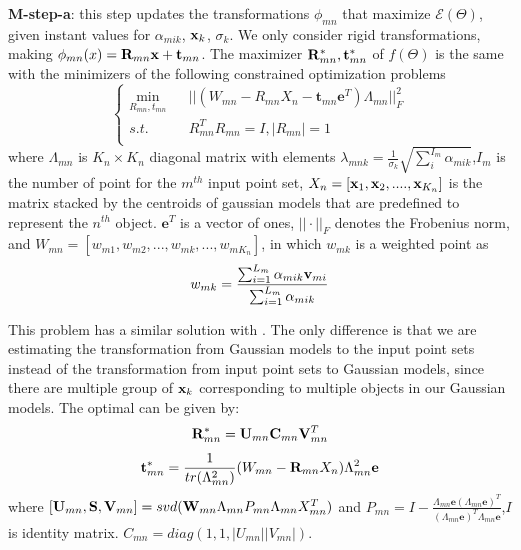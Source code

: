 \textbf{M-step-a}: this step updates the transformations $\phi_{mn}$ that maximize $\mathcal{E}(\Theta)$, given instant values for $\alpha_{mik}$, $\mathbf{x}_k$, $\sigma_k$.
%
We only consider rigid transformations, making  $\phi_{mn}(x)=\mathbf{R}_{mn}\mathbf{x}+\mathbf{t}_{mn}$. The maximizer $\mathbf{R}_{mn}^*,\mathbf{t}_{mn}^*$ of $f(\Theta)$ is the same with the minimizers of the following constrained optimization problems
%
\begin{equation}
\left\{
\begin{array}{rcl}
\min_{R_{mn},t_{mn}}&      &||(W_{mn}-R_{mn}X_n-\pmb t_{mn}\mathbf{e}^T)\Lambda_{mn}||_F^2\\
s.t.&      &R_{mn}^TR_{mn}=I, |R_{mn}|=1\\
\end{array} \right.
\end{equation}
where $\Lambda_{mn}$ is $K_n \times K_n$ diagonal matrix with elements $\lambda_{mnk}=\frac{1}{\sigma_k}\sqrt{\sum_i^{I_{m}}\alpha_{mik}}$,$I_m$ is the number of point for the $m^{th}$ input point set, $X_n = [\mathbf{x}_1, \mathbf{x}_2,...., \mathbf{x}_{K_n}]$ is the matrix stacked by the centroids of gaussian models that are predefined to represent the $n^{th}$ object. $\mathbf{e}^T$ is a vector of ones, $||\cdot||_F$ denotes the Frobenius norm, and $W_{mn}=[w_{m1},w_{m2},...,w_{mk},...,w_{mK_n}]$, in which $w_{mk}$ is a weighted point as
%
\begin{equation}
w_{mk}=\frac{\sum_{i=1}^{L_m}\alpha_{mik} \mathbf{v}_{mi}}{\sum_{i=1}^{L_m}\alpha_{mik}}
\end{equation}

This problem has a similar solution with \cite{Evangelidis2014}. 
The only difference is that we are estimating the transformation from Gaussian models to the input point sets instead of the transformation from input point sets to Gaussian models, since there are multiple group of $\mathbf{x}_k$ corresponding to multiple objects in our Gaussian models. The optimal can be given by:
%
\begin{equation}
\label{equ:updateR}
\mathbf{R}_{mn}^*=\mathbf{U}_{mn}\mathbf{C}_{mn}\mathbf{V}_{mn}^T
\end{equation}
\begin{equation}
\label{equ:updatet}
\mathbf{t}_{mn}^*=\frac{1}{tr(\Lambda_{mn}^2)}(W_{mn}-\mathbf{R}_{mn}X_n)\Lambda_{mn}^2\mathbf{e}
\end{equation}
where $[\mathbf{U}_{mn},\mathbf{S},\mathbf{V}_{mn}]=svd( \mathbf{W}_{mn}\Lambda_{mn}P_{mn}\Lambda_{mn}X_{mn}^T )$ and $P_{mn}=I-\frac{\Lambda_{mn}\mathbf{e}(\Lambda_{mn}\mathbf{e})^T}{(\Lambda_{mn}\mathbf{e})^T\Lambda_{mn}\mathbf{e}}$,$I$ is identity matrix. $C_{mn}=diag(1,1,|U_{mn}||V_{mn}|)$.

